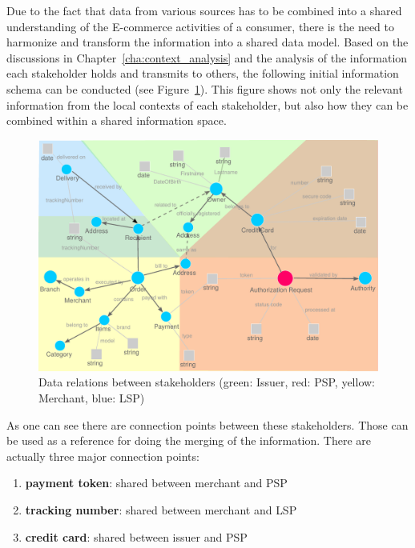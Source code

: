 Due to the fact that data from various sources has to be combined into a shared understanding of the E-commerce activities of a consumer, there is the need to harmonize and transform the information into a shared data model. Based on the discussions in Chapter~\ref{cha:context_analysis} and the analysis of the information each stakeholder holds and transmits to others, the following initial information schema can be conducted (see Figure~\ref{fig:images_data_model}). This figure shows not only the relevant information from the local contexts of each stakeholder, but also how they can be combined within a shared information space. \\

\begin{figure}[!ht]
  \centering
  \includegraphics[width=0.9\columnwidth]{images/ontology_scenario_1.pdf}
  \caption{Data relations between stakeholders (green: Issuer, red: \gls{PSP}, yellow: Merchant, blue: \gls{LSP})}
\label{fig:images_data_model}
\end{figure}

As one can see there are connection points between these stakeholders. Those can be used as a reference for doing the merging of the information. There are actually three major connection points: \@

\begin{enumerate}
  \item \textbf{payment token}: shared between merchant and \gls{PSP}
  \item \textbf{tracking number}: shared between merchant and \gls{LSP}
  \item \textbf{credit card}: shared between issuer and \gls{PSP}
\end{enumerate}

